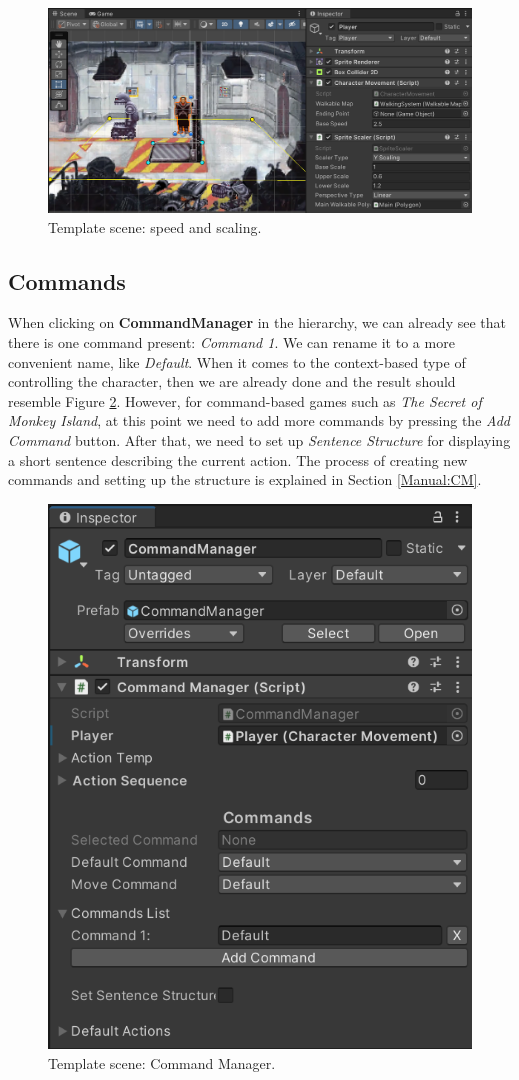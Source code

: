 \begin{figure}[H]
\centering
\includegraphics[width=1\linewidth]{img/User doc/image_2025-07-08_111936005.png}
\caption{Template scene: speed and scaling.}
\label{fig:Tutorial-template:Speed&Scaling}
\end{figure}

\subsection{Commands}
When clicking on \textbf{CommandManager} in the hierarchy, we can already see that there is one command present: \textit{Command 1}. We can rename it to a more convenient name, like \textit{Default}. When it comes to the context-based type of controlling the character, then we are already done and the result should resemble Figure \ref{fig:Tutorial-template:CM}. However, for command-based games such as \textit{The Secret of Monkey Island}, at this point we need to add more commands by pressing the \textit{Add Command} button. After that, we need to set up \textit{Sentence Structure} for displaying a short sentence describing the current action. The process of creating new commands and setting up the structure is explained in Section \ref{Manual:CM}. 

\begin{figure}[H]
\centering
\includegraphics[width=0.6\linewidth]{img/User doc/image_2025-07-08_214350710.png}
\caption{Template scene: Command Manager.}
\label{fig:Tutorial-template:CM}
\end{figure}

